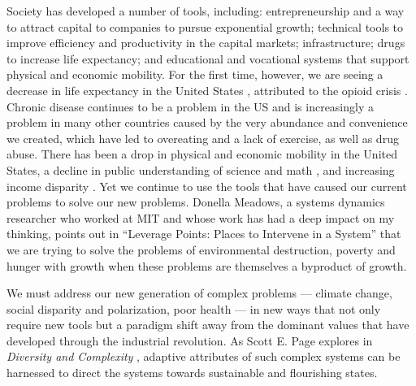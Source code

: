 Society has developed a number of tools, including: entrepreneurship and a way to attract capital to companies to pursue exponential growth; technical tools to improve efficiency and productivity in the capital markets; infrastructure; drugs to increase life expectancy; and educational and vocational systems that support physical and economic mobility. For the first time, however, we are seeing a decrease in life expectancy in the United States \cite{kmxa17}, attributed to the opioid crisis \cite{LifeExpe48:online}. Chronic disease continues to be a problem in the US and is increasingly a problem in many other countries caused by the very abundance and convenience we created, which have led to overeating and a lack of exercise, as well as drug abuse. There has been a drop in physical and economic mobility in the United States, a decline in public understanding of science and math \cite{noauthor_internationally_nodate}, and increasing income disparity \cite{alston_statement_2017}. Yet we continue to use the tools that have caused our current problems to solve our new problems. Donella Meadows, a systems dynamics researcher who worked at MIT and whose work has had a deep impact on my thinking, points out in ``Leverage Points: Places to Intervene in a System'' \cite{meadows_leverage} that we are trying to solve the problems of environmental destruction, poverty and hunger with growth when these problems are themselves a byproduct of growth. 

We must address our new generation of complex problems --- climate change, social disparity and polarization, poor health --- in new ways that not only require new tools but a paradigm shift away from the dominant values that have developed through the industrial revolution. As Scott E. Page explores in \textit{Diversity and Complexity} \cite{page2010diversity}, adaptive attributes of such complex systems can be harnessed to direct the systems towards sustainable and flourishing states.
% 
% 

